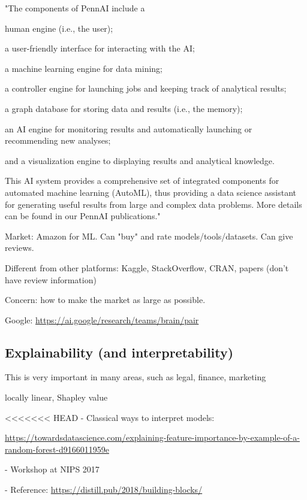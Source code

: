 \documentclass[english]{article}
\begin{document}
\item "The components of PennAI include a 

human engine (i.e., the user); 

a user-friendly interface for interacting with the AI; 

a machine learning engine for data mining; 

a controller engine for launching jobs and keeping track of analytical results; 

a graph database for storing data and results (i.e., the memory); 

an AI engine for monitoring results and automatically launching or recommending new analyses; 

and a visualization engine to displaying results and analytical knowledge. 

This AI system provides a comprehensive set of integrated components for automated machine learning (AutoML), thus providing a data science assistant for generating useful results from large and complex data problems. More details can be found in our PennAI publications."

\item Market: Amazon for ML. Can "buy" and rate models/tools/datasets. Can give reviews. 

Different from other platforms: Kaggle, StackOverflow, CRAN, papers (don't have review information)

Concern: how to make the market as large as possible.  

\item Google: \url{https://ai.google/research/teams/brain/pair}
\eenum 


\subsection{Explainability (and interpretability)}


\benum 
\item This is very important in many areas, such as legal, finance, marketing

locally linear, Shapley value

<<<<<<< HEAD
- Classical ways to interpret models: 

\url{https://towardsdatascience.com/explaining-feature-importance-by-example-of-a-random-forest-d9166011959e}

- Workshop at NIPS 2017

- Reference: \url{https://distill.pub/2018/building-blocks/}
\end{document}
